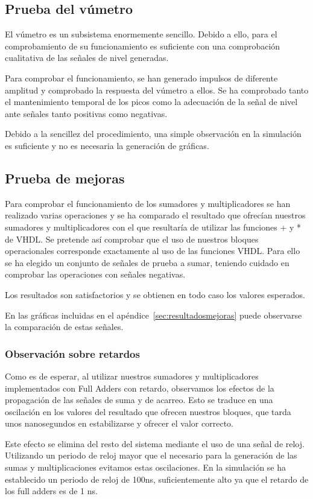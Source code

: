 \documentclass[a4paper,12pt]{article}
\begin{document}
\subsection{Prueba del vúmetro}
El vúmetro es un subsistema enormemente sencillo. Debido a ello, para el comprobamiento de su funcionamiento es suficiente con una comprobación cualitativa de las señales de nivel generadas.

Para comprobar el funcionamiento, se han generado impulsos de diferente amplitud y comprobado la respuesta del vúmetro a ellos. Se ha comprobado tanto el mantenimiento temporal de los picos como la adecuación de la señal de nivel ante señales tanto positivas como negativas.

Debido a la sencillez del procedimiento, una simple observación en la simulación es suficiente y no es necesaria la generación de gráficas.

\subsection{Prueba de mejoras}
Para comprobar el funcionamiento de los sumadores y multiplicadores se han realizado varias operaciones y se ha comparado el resultado que ofrecían nuestros sumadores y multiplicadores con el que resultaría de utilizar las funciones + y * de VHDL. Se pretende así comprobar que el uso de nuestros bloques operacionales corresponde exactamente al uso de las funciones VHDL. Para ello se ha elegido un conjunto de señales de prueba a sumar, teniendo cuidado en comprobar las operaciones con señales negativas.

Los resultados son satisfactorios y se obtienen en todo caso los valores esperados.

En las gráficas incluidas en el apéndice~\ref{sec:resultadosmejoras} puede observarse la comparación de estas señales.

\subsubsection*{Observación sobre retardos}
Como es de esperar, al utilizar nuestros sumadores y multiplicadores implementados con Full Adders con retardo, observamos los efectos de la propagación de las señales de suma y de acarreo. Esto se traduce en una oscilación en los valores del resultado que ofrecen nuestros bloques, que tarda unos nanosegundos en estabilizarse y ofrecer el valor correcto.

Este efecto se elimina del resto del sistema mediante el uso de una señal de reloj. Utilizando un periodo de reloj mayor que el necesario para la generación de las sumas y multiplicaciones evitamos estas oscilaciones. En la simulación se ha establecido un periodo de reloj de 100ns, suficientemente alto ya que el retardo de los full adders es de 1 ns.
\end{document}
